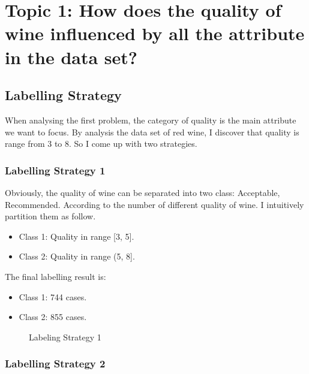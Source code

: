 \documentclass[titlepage,a4paper,12pt,thmsb]{report}
\begin{document}
\chapter{Topic 1: How does the quality of wine influenced by all the attribute in the data set? }
\section{Labelling Strategy}

When analysing the first problem, the category of quality is the main attribute we want to focus. By analysis the data set of red wine, I discover that quality is range from 3 to 8. So I come up with two strategies.


\newpage

\subsection{Labelling Strategy 1}

Obviously, the quality of wine can be separated into two class: Acceptable, Recommended. According to the number of different quality of wine. I intuitively partition them as follow.

\begin{itemize}
\item{Class 1: Quality in range [3, 5].}
\item{Class 2: Quality in range (5, 8].}
\end{itemize}

The final labelling result is:

\begin{itemize}
\item{Class 1: 744 cases.}
\item{Class 2: 855 cases.}
\end{itemize}

\begin{center}
\begin{figure}[hbtp]
{\par}
\caption{ Labeling Strategy 1}
\end{figure}
{}
\end{center}

\newpage

\subsection{Labelling Strategy 2}
\end{document}
